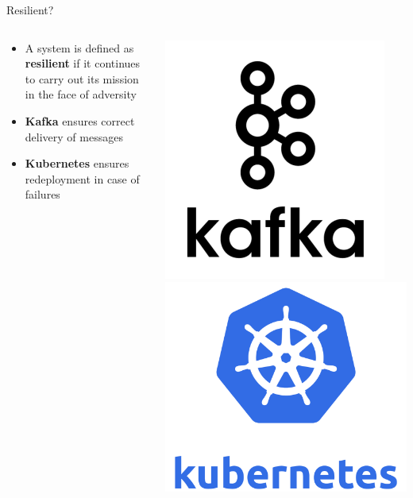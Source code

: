 \documentclass{beamer}
\begin{document}
\begin{frame}{Resilient?}
\begin{columns}
    \begin{column}{0.5\textwidth}
    \begin{itemize}
        \item A system is defined as \textbf{resilient} if it continues to carry out its mission in the face of adversity
        \item \textbf{Kafka} ensures correct delivery of messages
        \item \textbf{Kubernetes} ensures redeployment in case of failures
    \end{itemize}    
    \end{column}    
    \begin{column}{0.4\textwidth}
        \begin{center}
            \includegraphics[width=0.5\columnwidth]{figures/kafka_icon.png} \\
            \vspace{0.5cm}
            \includegraphics[width=0.5\columnwidth]{figures/kubernetes_icon.png}
        \end{center}
    \end{column}
\end{columns}
\end{frame}
\end{document}
